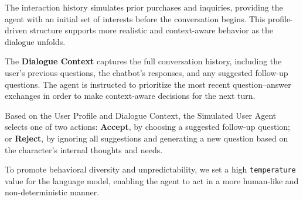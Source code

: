 The interaction history simulates prior purchases and inquiries, providing the agent with an initial set of interests before the conversation begins. This profile-driven structure supports more realistic and context-aware behavior as the dialogue unfolds.



The \textbf{Dialogue Context} captures the full conversation history, including the user's previous questions, the chatbot’s responses, and any suggested follow-up questions. The agent is instructed to prioritize the most recent question–answer exchanges in order to make context-aware decisions for the next turn.



Based on the User Profile and Dialogue Context, the Simulated User Agent selects one of two actions: \textbf{Accept}, by choosing a suggested follow-up question; or \textbf{Reject}, by ignoring all suggestions and generating a new question based on the character’s internal thoughts and needs.

To promote behavioral diversity and unpredictability, we set a high \texttt{temperature} value for the language model, enabling the agent to act in a more human-like and non-deterministic manner.



